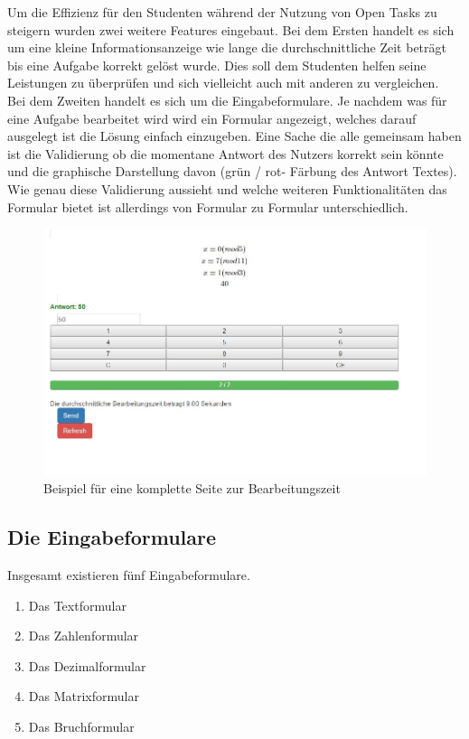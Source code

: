 Um die Effizienz für den Studenten während der Nutzung von Open Tasks zu steigern wurden zwei weitere Features eingebaut. Bei dem Ersten handelt es sich um eine kleine Informationsanzeige wie lange die durchschnittliche Zeit beträgt bis eine Aufgabe korrekt gelöst wurde. Dies soll dem Studenten helfen seine Leistungen zu überprüfen und sich vielleicht auch mit anderen zu vergleichen. \\
Bei dem Zweiten handelt es sich um die Eingabeformulare. Je nachdem was für eine Aufgabe bearbeitet wird wird ein Formular angezeigt, welches darauf ausgelegt ist die Lösung einfach einzugeben. Eine Sache die alle gemeinsam haben ist die Validierung ob die momentane Antwort des Nutzers korrekt sein könnte und die graphische Darstellung davon (grün / rot- Färbung des Antwort Textes). Wie genau diese Validierung aussieht und welche weiteren Funktionalitäten das Formular bietet ist allerdings von Formular zu Formular unterschiedlich.

\begin{figure}[htp]     %
\centering
\includegraphics[width=1\textwidth]{bilder/TotalClient} 
\caption[Beispiel für eine komplette Seite zur Bearbeitungszeit]{Beispiel für eine komplette Seite zur Bearbeitungszeit}
\end{figure} 


\subsection{Die Eingabeformulare}

Insgesamt existieren fünf Eingabeformulare.
\begin{enumerate}
\item Das Textformular
\item Das Zahlenformular
\item Das Dezimalformular
\item Das Matrixformular
\item Das Bruchformular
\end{enumerate}

